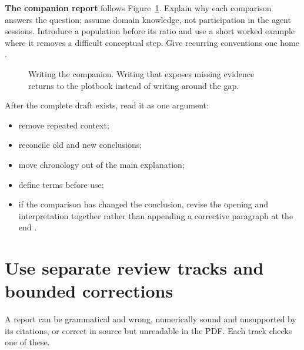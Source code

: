 \textbf{The companion report} follows Figure~\ref{fig:reports-companion}. Explain why
each comparison answers the question; assume domain knowledge, not participation in the
agent sessions. Introduce a population before its ratio and use a short worked example
where it removes a difficult conceptual step. Give recurring conventions one home
\cite[Write the companion after settling the plotbook]{skill:report-production}.

\begin{figure}[H]
  \centering
  \caption{Writing the companion. Writing that exposes missing evidence returns to the
    plotbook instead of writing around the gap.}
  \label{fig:reports-companion}
\end{figure}

After the complete draft exists, read it as one argument:
\begin{itemize}
  \item remove repeated context;
  \item reconcile old and new conclusions;
  \item move chronology out of the main explanation;
  \item define terms before use;
  \item if the comparison has changed the conclusion, revise the opening and interpretation
        together rather than appending a corrective paragraph at the end \cite[Design the
          argument; Writing character]{skill:report-production}.
\end{itemize}

\section{Use separate review tracks and bounded corrections}

\begin{headline}
  A report can be grammatical and wrong, numerically sound and unsupported by its
  citations, or correct in source but unreadable in the PDF. Each track checks one of these.
\end{headline}

